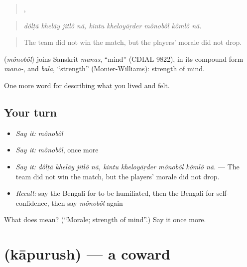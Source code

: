 \begin{quote}
   ,     
\end{quote}

\begin{quote}
\emph{dôlṭā khelāy jitlô nā, kintu kheloyāṛder mônobôl kômlô nā.}
\end{quote}

\begin{quote}
The team did not win the match, but the players' morale did not drop.
\end{quote}

\begin{cousinweb}
\textbf{} (\emph{mônobôl}) joins Sanskrit \emph{manas}, \textquotedblleft{}mind\textquotedblright{} (CDIAL 9822), in its compound form \emph{mano-}, and \emph{bala}, \textquotedblleft{}strength\textquotedblright{} (Monier-Williams): strength of mind.
\end{cousinweb}

\begin{grammarlens}[title={What you've built}]
One more word for describing what you lived and felt.
\end{grammarlens}

\subsection*{Your turn}
\begin{itemize}
\raggedright
  \item \emph{Say it:} \emph{mônobôl}
  \item \emph{Say it:} \emph{mônobôl}, once more
  \item \emph{Say it:} \emph{dôlṭā khelāy jitlô nā, kintu kheloyāṛder mônobôl kômlô nā.} — The team did not win the match, but the players' morale did not drop.
  \item \emph{Recall:} say the Bengali for to be humiliated, then the Bengali for self-confidence, then say \emph{mônobôl} again
\end{itemize}

\begin{tcolorbox}[breakable,colback=teal!4,colframe=teal!35!black,title={Before you move on}]
What does  mean? (\textquotedblleft{}Morale; strength of mind\textquotedblright{}.) Say it once more.
\end{tcolorbox}
\section[\texorpdfstring{\bn{কাপুরুষ} (kāpurush)}{কাপুরুষ (kāpurush)}]{ (kāpurush) — a coward}

